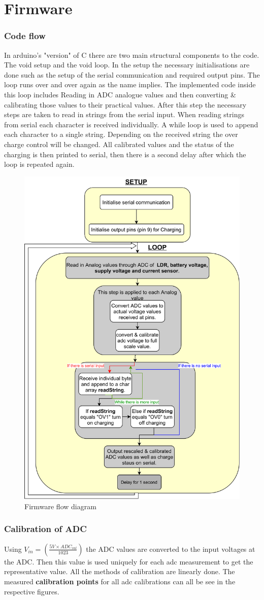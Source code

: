 \chapter{Firmware}

\subsection{Code flow}
In arduino's "version" of C there are two main structural components to the code. The void setup and the void loop. In the setup the necessary initialisations are done such as the setup of the serial communication and required output pins. The loop runs over and over again as the name implies. The implemented code inside this loop includes Reading in ADC analogue values and then converting \& calibrating those values to their practical values. After this step the necessary steps are taken to read in strings from the serial input. When reading strings from serial each character is received individually. A while loop is used to append each character to a single string. Depending on the received string the over charge control will be changed. All calibrated values and the status of the charging is then printed to serial, then there is a second delay after which the loop is repeated again.

\begin{figure}[!htb]
	\centering
	\includegraphics[width=0.5\linewidth]{Figures/A8/flowfirmware.png}
	\caption{Firmware flow diagram}
	\label{fig:flow}
\end{figure}

\subsection{Calibration of ADC}
Using $V_{in}=(\frac{5V\times ADC_{val} }{1023})$ the ADC values are converted to the input voltages at the ADC. Then this value is used uniquely for each adc measurement to get the representative value. All the methods of calibration are linearly done. The measured \textbf{calibration points} for all adc calibrations can all be see in the respective figures.






